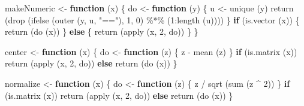 \documentclass[
  12pt,
]{book}
\newenvironment{Shaded}{\begin{snugshade}}{\end{snugshade}}
\newcommand{\ControlFlowTok}[1]{\textcolor[rgb]{0.13,0.29,0.53}{\textbf{#1}}}
\newcommand{\DecValTok}[1]{\textcolor[rgb]{0.00,0.00,0.81}{#1}}
\newcommand{\FunctionTok}[1]{\textcolor[rgb]{0.00,0.00,0.00}{#1}}
\newcommand{\NormalTok}[1]{#1}
\newcommand{\OtherTok}[1]{\textcolor[rgb]{0.56,0.35,0.01}{#1}}
\newcommand{\SpecialCharTok}[1]{\textcolor[rgb]{0.00,0.00,0.00}{#1}}
\newcommand{\StringTok}[1]{\textcolor[rgb]{0.31,0.60,0.02}{#1}}
\begin{document}
\begin{Shaded}
\begin{Highlighting}[]
\NormalTok{makeNumeric }\OtherTok{\textless{}{-}} \ControlFlowTok{function}\NormalTok{ (x) \{}
\NormalTok{  do }\OtherTok{\textless{}{-}} \ControlFlowTok{function}\NormalTok{ (y) \{}
\NormalTok{    u }\OtherTok{\textless{}{-}} \FunctionTok{unique}\NormalTok{ (y)}
    \FunctionTok{return}\NormalTok{ (}\FunctionTok{drop}\NormalTok{ (}\FunctionTok{ifelse}\NormalTok{ (}\FunctionTok{outer}\NormalTok{ (y, u, }\StringTok{"=="}\NormalTok{), }\DecValTok{1}\NormalTok{, }\DecValTok{0}\NormalTok{) }\SpecialCharTok{\%*\%}\NormalTok{ (}\DecValTok{1}\SpecialCharTok{:}\FunctionTok{length}\NormalTok{ (u))))}
\NormalTok{  \}}
  \ControlFlowTok{if}\NormalTok{ (}\FunctionTok{is.vector}\NormalTok{ (x)) \{}
    \FunctionTok{return}\NormalTok{ (}\FunctionTok{do}\NormalTok{ (x))}
\NormalTok{  \}}
  \ControlFlowTok{else}\NormalTok{ \{}
    \FunctionTok{return}\NormalTok{ (}\FunctionTok{apply}\NormalTok{ (x, }\DecValTok{2}\NormalTok{, do))}
\NormalTok{  \}}
\NormalTok{\}}

\NormalTok{center }\OtherTok{\textless{}{-}} \ControlFlowTok{function}\NormalTok{ (x) \{}
\NormalTok{  do }\OtherTok{\textless{}{-}} \ControlFlowTok{function}\NormalTok{ (z) \{}
\NormalTok{    z }\SpecialCharTok{{-}} \FunctionTok{mean}\NormalTok{ (z)}
\NormalTok{  \}}
  \ControlFlowTok{if}\NormalTok{ (}\FunctionTok{is.matrix}\NormalTok{ (x))}
    \FunctionTok{return}\NormalTok{ (}\FunctionTok{apply}\NormalTok{ (x, }\DecValTok{2}\NormalTok{, do))}
  \ControlFlowTok{else}
    \FunctionTok{return}\NormalTok{ (}\FunctionTok{do}\NormalTok{ (x))}
\NormalTok{\}}

\NormalTok{normalize }\OtherTok{\textless{}{-}} \ControlFlowTok{function}\NormalTok{ (x) \{}
\NormalTok{  do }\OtherTok{\textless{}{-}} \ControlFlowTok{function}\NormalTok{ (z) \{}
\NormalTok{    z }\SpecialCharTok{/} \FunctionTok{sqrt}\NormalTok{ (}\FunctionTok{sum}\NormalTok{ (z }\SpecialCharTok{\^{}} \DecValTok{2}\NormalTok{))}
\NormalTok{  \}}
  \ControlFlowTok{if}\NormalTok{ (}\FunctionTok{is.matrix}\NormalTok{ (x))}
    \FunctionTok{return}\NormalTok{ (}\FunctionTok{apply}\NormalTok{ (x, }\DecValTok{2}\NormalTok{, do))}
  \ControlFlowTok{else}
    \FunctionTok{return}\NormalTok{ (}\FunctionTok{do}\NormalTok{ (x))}
\NormalTok{\}}


\end{Highlighting}
\end{Shaded}
\end{document}
